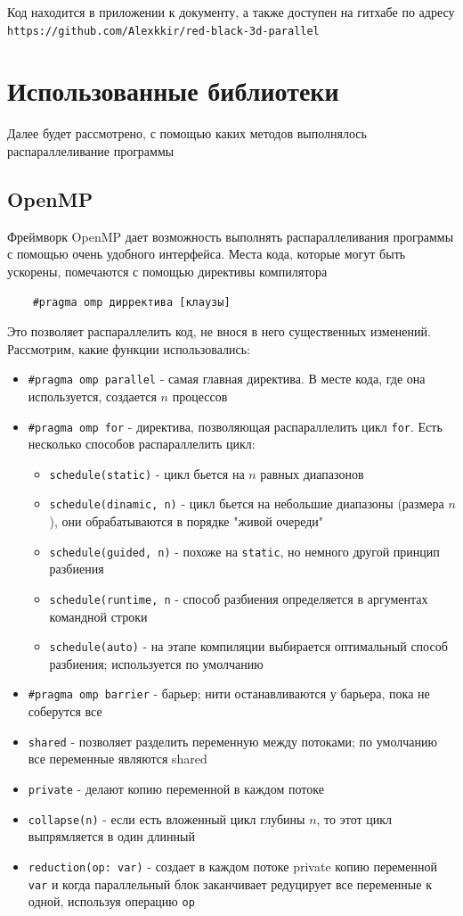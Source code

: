 \documentclass[./import.tex]{subfiles}
\begin{document}
Код находится в приложении к документу, а также доступен на гитхабе по адресу \texttt{https://github.com/Alexkkir/red-black-3d-parallel}

\section{Использованные библиотеки}
Далее будет рассмотрено, с помощью каких методов выполнялось распараллеливание программы

\subsection{OpenMP}
Фреймворк OpenMP дает возможность выполнять распараллеливания программы с помощью очень удобного интерфейса. Места кода, которые могут быть ускорены, помечаются с помощью директивы компилятора
\begin{verbatim}
    #pragma omp дирректива [клаузы]
\end{verbatim}
Это позволяет распараллелить код, не внося в него существенных изменений. Рассмотрим, какие функции использовались:
\begin{itemize}
    \item \verb|#pragma omp parallel| - самая главная директива. В месте кода, где она используется, создается $n$ процессов
    \item \verb|#pragma omp for| - директива, позволяющая распараллелить цикл \verb|for|. Есть несколько способов распараллелить цикл:
    \begin{itemize}
        \item \verb|schedule(static)| - цикл бьется на $n$ равных диапазонов
        \item \verb|schedule(dinamic, n)| - цикл бьется на небольшие диапазоны (размера $n$), они обрабатываются в порядке "живой очереди"
        \item \verb|schedule(guided, n)| - похоже на \verb|static|, но немного другой принцип разбиения
        \item \verb|schedule(runtime, n| - способ разбиения определяется в аргументах командной строки
        \item \verb|schedule(auto)| - на этапе компиляции выбирается оптимальный способ разбиения; используется по умолчанию
    \end{itemize}
    \item \verb|#pragma omp barrier| - барьер; нити останавливаются у барьера, пока не соберутся все
    \item \verb|shared| -  позволяет разделить переменную между потоками; по умолчанию все переменные являются shared
    \item \verb|private| - делают копию переменной в каждом потоке
    \item \verb|collapse(n)| - если есть вложенный цикл глубины $n$, то этот цикл выпрямляется в один длинный
    \item \verb|reduction(op: var)| - создает в каждом потоке private копию переменной \verb|var| и когда параллельный блок заканчивает редуцирует все переменные к одной, используя операцию \verb|op|
\end{itemize}
\end{document}
